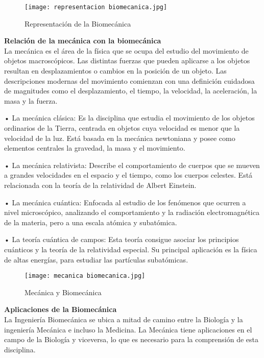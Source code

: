 \documentclass{article}
\begin{document}
\begin{figure} [htp]%
    \centering
    \texttt{[image: representacion biomecanica.jpg]} %
    \caption{Representación de la Biomecánica}
    \label{grafica}
\end{figure}
\textbf{Relación de la mecánica con la biomecánica} \\
La mecánica es el área de la física que se ocupa del estudio del movimiento de objetos macroscópicos. Las distintas fuerzas que pueden aplicarse a los objetos resultan en desplazamientos o cambios en la posición de un objeto. Las descripciones modernas del movimiento comienzan con una definición cuidadosa de magnitudes como el desplazamiento, el tiempo, la velocidad, la aceleración, la masa y la fuerza. \cite{ff3}
\begin{description}
\item •	La mecánica clásica: Es la disciplina que estudia el movimiento de los objetos ordinarios de la Tierra, centrada en objetos cuya velocidad es menor que la velocidad de la luz. Está basada en la mecánica newtoniana y posee como elementos centrales la gravedad, la masa y el movimiento.
\item •	La mecánica relativista:  Describe el comportamiento de cuerpos que se mueven a grandes velocidades en el espacio y el tiempo, como los cuerpos celestes. Está relacionada con la teoría de la relatividad de Albert Einstein.
\item •	La mecánica cuántica: Enfocada al estudio de los fenómenos que ocurren a nivel microscópico, analizando el comportamiento y la radiación electromagnética de la materia, pero a una escala atómica y subatómica.
\item •	La teoría cuántica de campos: Esta teoría consigue asociar los principios cuánticos y la teoría de la relatividad especial. Su principal aplicación es la física de altas energías, para estudiar las partículas subatómicas.
\end{description}
\begin{figure} [htp]%
    \centering
    \texttt{[image: mecanica biomecanica.jpg]} %
    \caption{Mecánica y Biomecánica}
    \label{grafica}
\end{figure}
\textbf{Aplicaciones de la Biomecánica} \\
La Ingeniería Biomecánica se ubica a mitad de camino entre la Biología y la ingeniería Mecánica e incluso la Medicina. La Mecánica tiene aplicaciones en el campo de la Biología y viceversa, lo que es necesario para la comprensión de esta disciplina. \\
\end{document}
